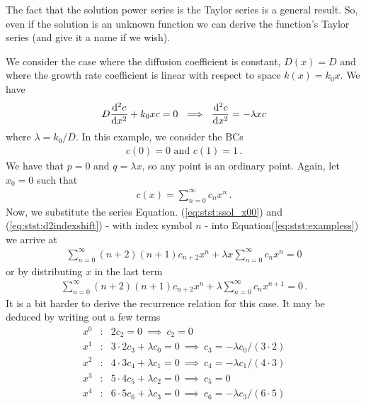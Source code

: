 \noindent The fact that the solution power series is the Taylor series is a general result. So, even if the
solution is an unknown function we can derive the function's Taylor series (and give it a name 
if we wish). 

\begin{example} \label{ex:stst:ss_1}
	We consider the case where the diffusion coefficient is constant, $D(x)=D$ 
	and	where the growth rate coefficient is linear with respect to space $k(x)= k_0 x$. We have
	\begin{equation}
		\label{eq:stst:exampless}
		D\frac{\mathrm{d}^2 c}{\mathrm{d} x^2} + k_0 x c = 0 \ \implies \ \frac{\mathrm{d}^2 c}{\mathrm{d} x^2} = -\lambda x c  
	\end{equation}
	where $ \lambda = k_0/D$. In this example, we consider the BCs 
	\begin{eqnarray}
		c(0)=0 \text{ and } c(1)=1 \, .
	\end{eqnarray}
	We have that $p=0$ and $q=\lambda x$, so any point is an ordinary point.
	Again, let $x_0=0$ such that  
	\begin{eqnarray}
		\label{eq:stst:ssol_x00}
		c(x) = \sum_{n=0}^\infty c_n x^n \, .
	\end{eqnarray}
	Now, we substitute the series Equation. (\ref{eq:stst:ssol_x00}) and (\ref{eq:stst:d2indexshift}) 
	- with index symbol $n$ - into	Equation(\ref{eq:stst:exampless}) we arrive at
	\begin{eqnarray}
		 \sum_{n=0}^\infty (n+2)(n+1)c_{n+2} x^n + \lambda x \sum_{n=0}^\infty c_n x^n = 0  
	\end{eqnarray}
	or by distributing $x$ in the last term
	\begin{eqnarray}
		\sum_{n=0}^\infty (n+2)(n+1)c_{n+2} x^n + \lambda \sum_{n=0}^\infty c_n x^{n+1} = 0 \, . 
	\end{eqnarray}
	It is a bit harder to derive the recurrence relation for this case. It may be deduced by writing
	out a few terms
	\begin{eqnarray}
		x^0 &:& 2c_2 = 0 \ \implies \ c_2 = 0 \nonumber \\
		x^1 &:& 3\cdot2 c_3 + \lambda c_0 = 0 \ \implies \ c_3 = -\lambda c_0/(3 \cdot 2) \nonumber \\
		x^2 &:& 4\cdot3 c_4 + \lambda c_1 = 0 \ \implies \ c_4 = -\lambda c_1/(4 \cdot 3) \nonumber \\
		x^3 &:& 5\cdot4 c_5 + \lambda c_2 = 0 \ \implies \ c_5 = 0 \nonumber \\
		x^4 &:& 6\cdot5 c_6 + \lambda c_3 = 0 \ \implies \ c_6 = -\lambda c_3/(6\cdot5) \nonumber \\

\end{eqnarray}
\end{example}

